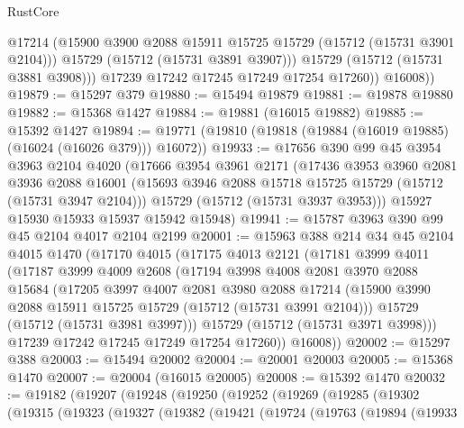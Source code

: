\begin{lexlean}{RustCore}
\begin{coremodule}
                @17214
                (@15900 @3900 @2088 @15911 @15725 @15729 (@15712 (@15731 @3901 @2104)))
                @15729
                (@15712 (@15731 @3891 @3907)))
              @15729
              (@15712 (@15731 @3881 @3908)))
            @17239
            @17242
            @17245
            @17249
            @17254
            @17260))
        @16008))
@19879 := @15297 @379
@19880 := @15494 @19879
@19881 := @19878 @19880
@19882 := @15368 @1427
@19884 := @19881 (@16015 @19882)
@19885 := @15392 @1427
@19894 := @19771 (@19810 (@19818 (@19884 (@16019 @19885) (@16024 (@16026 @379))) @16072))
@19933 := @17656
    @390
    @99
    @45
    @3954
    @3963
    @2104
    @4020
    (@17666
      @3954
      @3961
      @2171
      (@17436
        @3953
        @3960
        @2081
        @3936
        @2088
        @16001
        (@15693 @3946 @2088 @15718 @15725 @15729 (@15712 (@15731 @3947 @2104)))
        @15729
        (@15712 (@15731 @3937 @3953)))
      @15927
      @15930
      @15933
      @15937
      @15942
      @15948)
@19941 := @15787 @3963 @390 @99 @45 @2104 @4017 @2104 @2199
@20001 := @15963
    @388
    @214
    @34
    @45
    @2104
    @4015
    @1470
    (@17170
      @4015
      (@17175
        @4013
        @2121
        (@17181
          @3999
          @4011
          (@17187
            @3999
            @4009
            @2608
            (@17194
              @3998
              @4008
              @2081
              @3970
              @2088
              @15684
              (@17205
                @3997
                @4007
                @2081
                @3980
                @2088
                @17214
                (@15900 @3990 @2088 @15911 @15725 @15729 (@15712 (@15731 @3991 @2104)))
                @15729
                (@15712 (@15731 @3981 @3997)))
              @15729
              (@15712 (@15731 @3971 @3998)))
            @17239
            @17242
            @17245
            @17249
            @17254
            @17260))
        @16008))
@20002 := @15297 @388
@20003 := @15494 @20002
@20004 := @20001 @20003
@20005 := @15368 @1470
@20007 := @20004 (@16015 @20005)
@20008 := @15392 @1470
@20032 := @19182
    (@19207
      (@19248
        (@19250
          (@19252
            (@19269
              (@19285
                (@19302
                  (@19315
                    (@19323
                      (@19327
                        (@19382
                          (@19421
                            (@19724
                              (@19763
                                (@19894
                                  (@19933

\end{coremodule}
\end{lexlean}
